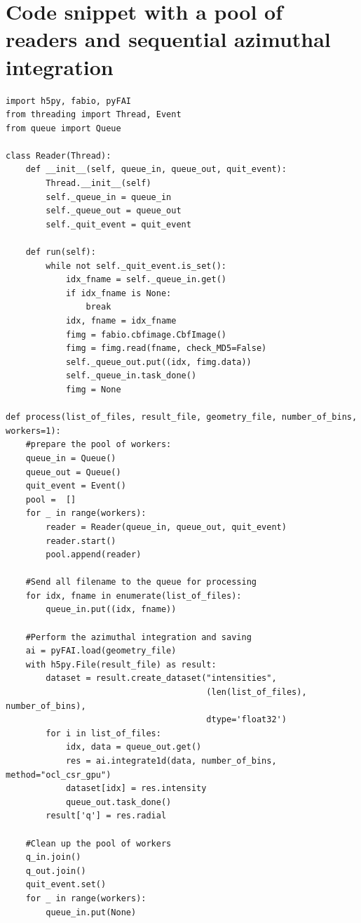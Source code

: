 \documentclass[preprint]{iucr}              %
\begin{document}
\goodbreak

\section{Code snippet with a pool of readers and sequential azimuthal
integration}

\begin{minipage}{\linewidth}
\label{poolsnippet}
\begin{verbatim}
import h5py, fabio, pyFAI
from threading import Thread, Event
from queue import Queue

class Reader(Thread):
    def __init__(self, queue_in, queue_out, quit_event):
        Thread.__init__(self)
        self._queue_in = queue_in
        self._queue_out = queue_out
        self._quit_event = quit_event

    def run(self):
        while not self._quit_event.is_set():
            idx_fname = self._queue_in.get()
            if idx_fname is None:
                break
            idx, fname = idx_fname
            fimg = fabio.cbfimage.CbfImage()
            fimg = fimg.read(fname, check_MD5=False)
            self._queue_out.put((idx, fimg.data))
            self._queue_in.task_done()
            fimg = None

def process(list_of_files, result_file, geometry_file, number_of_bins, workers=1):   
    #prepare the pool of workers:
    queue_in = Queue()
    queue_out = Queue()
    quit_event = Event()
    pool =  []
    for _ in range(workers):
        reader = Reader(queue_in, queue_out, quit_event)
        reader.start()
        pool.append(reader)
    
    #Send all filename to the queue for processing
    for idx, fname in enumerate(list_of_files):
        queue_in.put((idx, fname))

    #Perform the azimuthal integration and saving
    ai = pyFAI.load(geometry_file)
    with h5py.File(result_file) as result:
        dataset = result.create_dataset("intensities", 
                                        (len(list_of_files), number_of_bins),
                                        dtype='float32') 
        for i in list_of_files:
            idx, data = queue_out.get()
            res = ai.integrate1d(data, number_of_bins, method="ocl_csr_gpu")
            dataset[idx] = res.intensity
            queue_out.task_done()
        result['q'] = res.radial
	
	#Clean up the pool of workers
    q_in.join()
    q_out.join()
    quit_event.set()
    for _ in range(workers):
        queue_in.put(None)
\end{verbatim}
\end{minipage}
\end{document}
